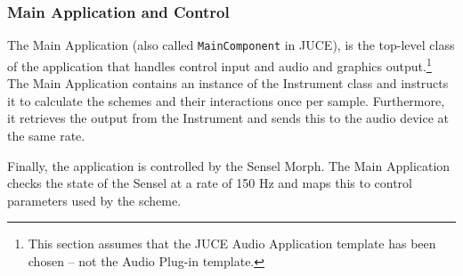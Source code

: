 \subsubsection{Main Application and Control}
The Main Application (also called \texttt{MainComponent} in JUCE), is the top-level class of the application that handles control input and audio and graphics output.\footnote{This section assumes that the JUCE Audio Application template has been chosen -- not the Audio Plug-in template.} The Main Application contains an instance of the Instrument class and instructs it to calculate the schemes and their interactions once per sample. Furthermore, it retrieves the output from the Instrument and sends this to the audio device at the same rate.

Finally, the application is controlled by the Sensel Morph. The Main Application checks the state of the Sensel at a rate of 150 Hz and maps this to control parameters used by the scheme.








